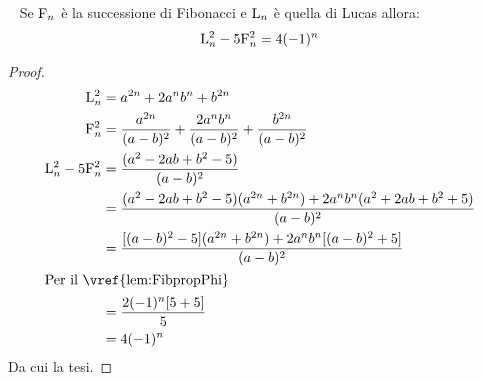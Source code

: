 \begin{thm}\label{thm:FibLucFondamentale}~\cite{Rabinowitz_1996}
	Se $\mathrm{F}_{n}$ è la successione di Fibonacci e  $\mathrm{L}_{n}$ è quella di Lucas allora:
	\begin{equation}
		\mathrm{L}_{n}^2-5\mathrm{F}_{n}^2=4(-1)^{n}
	\end{equation}\label{eqn:FibLucFondamentale}
\end{thm}
\begin{proof}
\begin{align*}
	\Luc{n}^2={}&a^{2n}+2a^nb^n+b^{2n}\\
	\Fib{n}^2={}&\dfrac{a^{2n}}{(a-b)^2}+\dfrac{2a^{n}b^{n}}{(a-b)^2}+\dfrac{b^{2n}}{(a-b)^2}\\
	\Luc{n}^2-5\Fib{n}^2={}&\dfrac{(a^2-2ab+b^2-5)}{(a-b)^2}\\
	={}&\dfrac{(a^2-2ab+b^2-5)(a^{2n}+b^{2n})+2a^nb^n(a^2+2ab+b^2+5)}{(a-b)^2}\\
	={}&\dfrac{[(a-b)^2-5](a^{2n}+b^{2n})+2a^nb^n[(a-b)^2+5]}{(a-b)^2}\\
	\intertext{Per il~\vref{lem:FibpropPhi}}
	={}&\dfrac{2(-1)^n[5+5]}{5}\\
	={}&4(-1)^n\\
\end{align*}
Da cui la tesi.
\end{proof}
